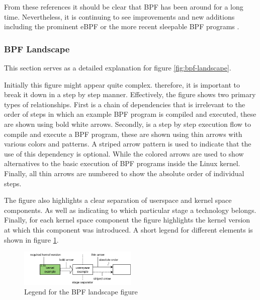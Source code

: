\documentclass[conference]{IEEEtran}
\begin{document}
From these references it should be clear that BPF has been around for a long
time. Nevertheless, it is continuing to see improvements and new additions
including the prominent eBPF or the more recent sleepable BPF
programs \cite{bpf-features}.

\subsubsection{BPF Landscape}

This section serves as a detailed explanation for
figure \ref{fig:bpf-landscape}.

Initially this figure might appear quite complex. therefore, it is important to
break it down in a step by step manner. Effectively, the figure shows two
primary types of relationships. First is a chain of dependencies that is
irrelevant to the order of steps in which an example BPF program is compiled and
executed, these are shown using bold white arrows. Secondly, is a step by step
execution flow to compile and execute a BPF program, these are shown using thin
arrows with various colors and patterns. A striped arrow pattern is used to
indicate that the use of this dependency is optional. While the colored arrows
are used to show alternatives to the basic execution of BPF programs
inside the Linux kernel. Finally, all thin arrows are numbered to show the
absolute order of individual steps.

The figure also highlights a clear separation of userspace and kernel space
components. As well as indicating to which particular stage a technology
belongs. Finally, for each kernel space component the figure highlights the
kernel version at which this component was introduced. A short legend for
different elements is shown in figure \ref{fig:bpf-landscape-legend}.

\begin{center}
	\begin{figure}[H]
		\includegraphics[width=0.5\textwidth]{resources/images/bpf-landscape-legend.png}
		\captionsetup{justification=centering}
		\caption{Legend for the BPF landscape figure}
		\label{fig:bpf-landscape-legend}
	\end{figure}
\end{center}
\end{document}
